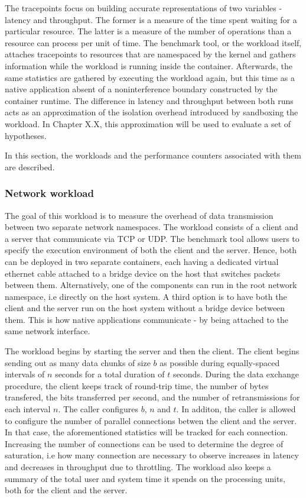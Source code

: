 The tracepoints focus on building accurate representations of two variables - latency and throughput. 
The former is a measure of the time spent waiting for a particular resource. The latter 
is a measure of the number of operations than a resource can process per unit of time.
The benchmark tool, or the workload itself, attaches tracepoints to resources 
that are namespaced by the kernel and gathers information while the workload is running inside 
the container. Afterwards, the same statistics are gathered by executing the workload again, but this time 
as a native application absent of a noninterference boundary constructed by the container runtime. 
The difference in latency and throughput between both runs acts as an approximation of the isolation 
overhead introduced by sandboxing the workload. In Chapter X.X, this approximation will be used 
to evaluate a set of hypotheses. 

In this section, the workloads and the performance counters associated with them are described. 

\subsubsection{Network workload}
The goal of this workload is to measure the overhead of data transmission between 
two separate network namespaces. The workload consists of a client and a server that communicate 
via TCP or UDP. The benchmark tool allows users to specify the execution environment of both the client 
and the server. Hence, both can be deployed in two separate containers, each having a dedicated
virtual ethernet cable attached to a bridge device on the host that switches packets between them.
Alternatively, one of the components can run 
in the root network namespace, i.e directly on the host system. A third option is to have both 
the client and the server run on the host system without a bridge device between them. This is how 
native applications communicate - by being attached to the same network interface. 

The workload begins by starting the server and then the client. The client begins sending out as many 
data chunks of size $b$ as possible during equally-spaced intervals of $n$ seconds for a total 
duration of $t$ seconds.
During the data exchange procedure, the client keeps track of round-trip time, the number 
of bytes transfered, the bits transferred per second, and the number of retransmissions for each interval $n$. 
The caller configures $b$, $n$ and $t$. In additon, the caller is allowed to configure the number 
of parallel connections betwen the client and the server. In that case, the aforementioned 
statistics will be tracked for each connection. Increasing the number of connections can be used to
determine the degree of saturation, i.e how many connection are necessary to 
observe increases in latency and decreases in throughput due to throttling.
The workload also keeps a summary of the total user and system time it spends on the processing units,
both for the client and the server.

